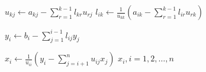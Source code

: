 \documentclass[varwidth]{standalone}
\begin{document}
\begin{algorithmic}[1]
        \State $u_{kj} \gets a_{kj} - \displaystyle\sum_{r=1}^{k-1}l_{kr}u_{rj}$
    \EndFor
        \State $l_{ik} \gets \displaystyle\frac{1}{u_{kk}}\left( a_{ik} - \sum_{r=1}^{k-1}l_{ir}u_{rk} \right)$
    \EndFor
\EndFor

   \State $y_i \gets b_i - \displaystyle\sum_{j=1}^{i-1}l_{ij}y_j$
\EndFor

   \State $x_i \gets \displaystyle\frac{1}{u_{ii}} \left( y_i - \sum_{j=i+1}^n u_{ij}x_j \right)$
\EndFor
\State \Return $x_i, i = 1, 2, \ldots, n$

\EndFunction
\end{algorithmic}
\end{document}
